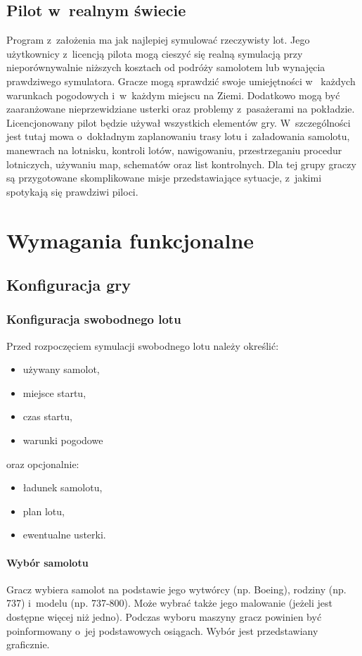 \documentclass{mwrep}
\begin{document}
\section{Pilot w~realnym świecie}

Program z~założenia ma jak najlepiej symulować rzeczywisty lot. Jego użytkownicy z~licencją pilota mogą cieszyć się realną symulacją przy nieporównywalnie niższych kosztach od podróży samolotem lub wynajęcia prawdziwego symulatora. Gracze mogą sprawdzić swoje umiejętności w~ każdych warunkach pogodowych i~w~każdym miejscu na Ziemi. Dodatkowo mogą być zaaranżowane nieprzewidziane usterki oraz problemy z~pasażerami na pokładzie. Licencjonowany pilot będzie używał wszystkich elementów gry. W~szczególności jest tutaj mowa o~dokładnym zaplanowaniu trasy lotu i~załadowania samolotu, manewrach na lotnisku, kontroli lotów, nawigowaniu, przestrzeganiu procedur lotniczych, używaniu map, schematów oraz list kontrolnych. Dla tej grupy graczy są przygotowane skomplikowane misje przedstawiające sytuacje, z~jakimi spotykają się prawdziwi piloci.

\chapter{Wymagania funkcjonalne}

\section{Konfiguracja gry}

\subsection{Konfiguracja swobodnego lotu}

Przed rozpoczęciem symulacji swobodnego lotu należy określić:
\begin{itemize}
\item używany samolot,
\item miejsce startu,
\item czas startu,
\item warunki pogodowe
\end{itemize}
oraz opcjonalnie:
\begin{itemize}
\item ładunek samolotu,
\item plan lotu,
\item ewentualne usterki.
\end{itemize}

\subsubsection{Wybór samolotu}
Gracz wybiera samolot na podstawie jego wytwórcy (np. Boeing), rodziny (np. 737) i~modelu (np. 737-800). Może wybrać także jego malowanie (jeżeli jest dostępne więcej niż jedno). Podczas wyboru maszyny gracz powinien być poinformowany o~jej podstawowych osiągach. Wybór jest przedstawiany graficznie.
\end{document}

